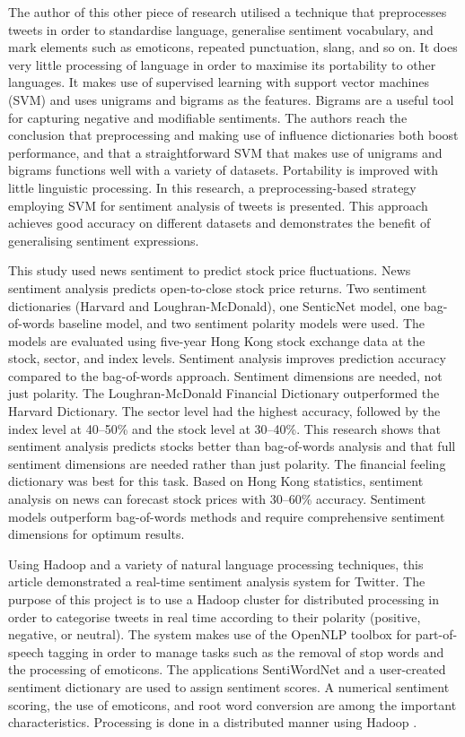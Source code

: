 \documentclass[12pt, a4paper,twoside]{report}
\theoremstyle{plain} %
\theoremstyle{definition} %
\theoremstyle{remark} %
\numberwithin{equation}{chapter}
\begin{document}
The author of this other piece of research utilised a technique that preprocesses tweets in order to standardise language, generalise sentiment vocabulary, and mark elements such as emoticons, repeated punctuation, slang, and so on. It does very little processing of language in order to maximise its portability to other languages. It makes use of supervised learning with support vector machines (SVM) and uses unigrams and bigrams as the features. Bigrams are a useful tool for capturing negative and modifiable sentiments. The authors reach the conclusion that preprocessing and making use of influence dictionaries both boost performance, and that a straightforward SVM that makes use of unigrams and bigrams functions well with a variety of datasets. Portability is improved with little linguistic processing. In this research, a preprocessing-based strategy employing SVM for sentiment analysis of tweets is presented. This approach achieves good accuracy on different datasets and demonstrates the benefit of generalising sentiment expressions\cite{Cambria2013}.

This study used news sentiment to predict stock price fluctuations. News sentiment analysis predicts open-to-close stock price returns. Two sentiment dictionaries (Harvard and Loughran-McDonald), one SenticNet model, one bag-of-words baseline model, and two sentiment polarity models were used. The models are evaluated using five-year Hong Kong stock exchange data at the stock, sector, and index levels. Sentiment analysis improves prediction accuracy compared to the bag-of-words approach. Sentiment dimensions are needed, not just polarity. The Loughran-McDonald Financial Dictionary outperformed the Harvard Dictionary. The sector level had the highest accuracy, followed by the index level at 40--50\% and the stock level at 30--40\%. This research shows that sentiment analysis predicts stocks better than bag-of-words analysis and that full sentiment dimensions are needed rather than just polarity. The financial feeling dictionary was best for this task. Based on Hong Kong statistics, sentiment analysis on news can forecast stock prices with 30--60\% accuracy. Sentiment models outperform bag-of-words methods and require comprehensive sentiment dimensions for optimum results\cite{Chan2017}.

Using Hadoop and a variety of natural language processing techniques, this article demonstrated a real-time sentiment analysis system for Twitter. The purpose of this project is to use a Hadoop cluster for distributed processing in order to categorise tweets in real time according to their polarity (positive, negative, or neutral). The system makes use of the OpenNLP toolbox for part-of-speech tagging in order to manage tasks such as the removal of stop words and the processing of emoticons. The applications SentiWordNet and a user-created sentiment dictionary are used to assign sentiment scores. A numerical sentiment scoring, the use of emoticons, and root word conversion are among the important characteristics. Processing is done in a distributed manner using Hadoop \cite{Mohapatra2017}.
\end{document}
